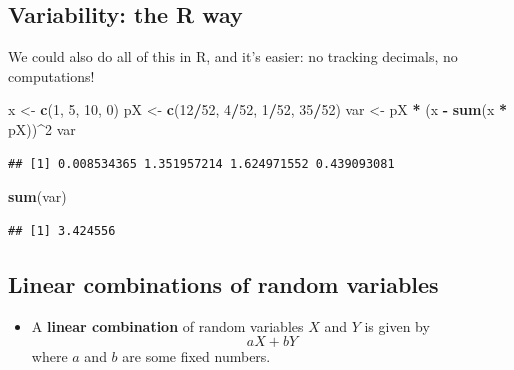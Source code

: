 \documentclass[
]{article}
\newenvironment{Shaded}{\begin{snugshade}}{\end{snugshade}}
\newcommand{\DecValTok}[1]{\textcolor[rgb]{0.00,0.00,0.81}{#1}}
\newcommand{\KeywordTok}[1]{\textcolor[rgb]{0.13,0.29,0.53}{\textbf{#1}}}
\newcommand{\NormalTok}[1]{#1}
\newcommand{\OperatorTok}[1]{\textcolor[rgb]{0.81,0.36,0.00}{\textbf{#1}}}
\newcommand{\StringTok}[1]{\textcolor[rgb]{0.31,0.60,0.02}{#1}}
\providecommand{\tightlist}{%
  \setlength{\itemsep}{0pt}\setlength{\parskip}{0pt}}
\begin{document}
\hypertarget{variability-the-r-way}{%
\subsection{Variability: the R way}\label{variability-the-r-way}}

We could also do all of this in R, and it's easier: no tracking
decimals, no computations!

\begin{Shaded}
\begin{Highlighting}[]
\NormalTok{x <-}\StringTok{ }\KeywordTok{c}\NormalTok{(}\DecValTok{1}\NormalTok{, }\DecValTok{5}\NormalTok{, }\DecValTok{10}\NormalTok{, }\DecValTok{0}\NormalTok{)}
\NormalTok{pX <-}\StringTok{ }\KeywordTok{c}\NormalTok{(}\DecValTok{12}\OperatorTok{/}\DecValTok{52}\NormalTok{, }\DecValTok{4}\OperatorTok{/}\DecValTok{52}\NormalTok{, }\DecValTok{1}\OperatorTok{/}\DecValTok{52}\NormalTok{, }\DecValTok{35}\OperatorTok{/}\DecValTok{52}\NormalTok{)}
\NormalTok{var <-}\StringTok{ }\NormalTok{pX }\OperatorTok{*}\StringTok{ }\NormalTok{(x }\OperatorTok{-}\StringTok{ }\KeywordTok{sum}\NormalTok{(x }\OperatorTok{*}\StringTok{ }\NormalTok{pX))}\OperatorTok{^}\DecValTok{2}
\NormalTok{var}
\end{Highlighting}
\end{Shaded}

\begin{verbatim}
## [1] 0.008534365 1.351957214 1.624971552 0.439093081
\end{verbatim}

\begin{Shaded}
\begin{Highlighting}[]
\KeywordTok{sum}\NormalTok{(var)}
\end{Highlighting}
\end{Shaded}

\begin{verbatim}
## [1] 3.424556
\end{verbatim}

\hypertarget{linear-combinations-of-random-variables}{%
\subsection{Linear combinations of random
variables}\label{linear-combinations-of-random-variables}}

\begin{itemize}
\tightlist
\item
  A \textbf{linear combination} of random variables \(X\) and \(Y\) is
  given by \[
  aX + bY 
  \] where \(a\) and \(b\) are some fixed numbers.
\end{itemize}
\end{document}
